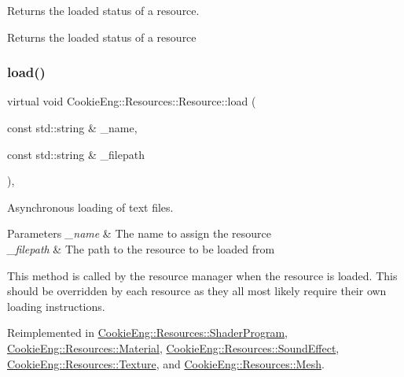 Returns the loaded status of a resource. 

Returns the loaded status of a resource \mbox{\label{class_cookie_eng_1_1_resources_1_1_resource_a75648b8f2e442bebc90d6eb4ea3a2f6e}} 
\subsubsection{\texorpdfstring{load()}{load()}}
{\footnotesize\ttfamily virtual void Cookie\+Eng\+::\+Resources\+::\+Resource\+::load (\begin{DoxyParamCaption}\item[{const std\+::string \&}]{\+\_\+name,  }\item[{const std\+::string \&}]{\+\_\+filepath }\end{DoxyParamCaption})\hspace{0.3cm}{\ttfamily [inline]}, {\ttfamily [virtual]}}



Asynchronous loading of text files. 


\begin{DoxyParams}{Parameters}
{\em \+\_\+name} & The name to assign the resource \\
\hline
{\em \+\_\+filepath} & The path to the resource to be loaded from\\
\hline
\end{DoxyParams}
This method is called by the resource manager when the resource is loaded. This should be overridden by each resource as they all most likely require their own loading instructions. 

Reimplemented in \hyperlink{class_cookie_eng_1_1_resources_1_1_shader_program_aef29916bad667d1f820053fd891d9e58}{Cookie\+Eng\+::\+Resources\+::\+Shader\+Program}, \hyperlink{class_cookie_eng_1_1_resources_1_1_material_a5d14ee55b9ce265cd557b85efd0e5722}{Cookie\+Eng\+::\+Resources\+::\+Material}, \hyperlink{class_cookie_eng_1_1_resources_1_1_sound_effect_a702862c8bf0f69c19ef5e680f0e18ca0}{Cookie\+Eng\+::\+Resources\+::\+Sound\+Effect}, \hyperlink{class_cookie_eng_1_1_resources_1_1_texture_a1f2d72c781dba6262ac5ca6e8898fc8d}{Cookie\+Eng\+::\+Resources\+::\+Texture}, and \hyperlink{struct_cookie_eng_1_1_resources_1_1_mesh_ae31053c6edaf0e735d85350bfa6093fb}{Cookie\+Eng\+::\+Resources\+::\+Mesh}.

